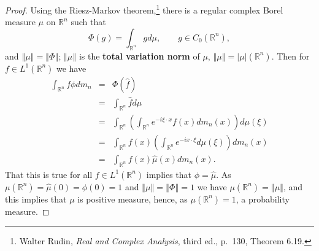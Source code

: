\documentclass{article}
\newcommand{\norm}[1]{\left\Vert #1 \right\Vert}
\theoremstyle{definition}
\theoremstyle{definition}
\begin{document}
\begin{proof}
Using the Riesz-Markov theorem,\footnote{Walter Rudin, {\em Real and Complex Analysis}, third ed., p.~130, Theorem 6.19.}
there is a regular complex Borel measure $\mu$ on $\mathbb{R}^n$ such that
\[
\Phi(g) = \int_{\mathbb{R}^n} g d\mu, \qquad g \in C_0(\mathbb{R}^n),
\]
and $\norm{\mu}=\norm{\Phi}$; $\norm{\mu}$ is the \textbf{total variation norm} of $\mu$, $\norm{\mu}=|\mu|(\mathbb{R}^n)$.
Then for $f \in L^1(\mathbb{R}^n)$ we have
\begin{eqnarray*}
\int_{\mathbb{R}^n} f\phi dm_n&=&\Phi(\hat{f})\\
&=&\int_{\mathbb{R}^n} \hat{f} d\mu \\
&=&\int_{\mathbb{R}^n}\left( \int_{\mathbb{R}^n} e^{-i\xi\cdot x} f(x) dm_n(x) \right) d\mu(\xi)\\
&=&\int_{\mathbb{R}^n} f(x) \left( \int_{\mathbb{R}^n} e^{-ix\cdot \xi} d\mu(\xi) \right) dm_n(x)\\
&=&\int_{\mathbb{R}^n} f(x) \hat{\mu}(x) dm_n(x).
\end{eqnarray*}
That this is true for all $f \in L^1(\mathbb{R}^n)$ implies that $\phi=\hat{\mu}$.
As $\mu(\mathbb{R}^n)=\hat{\mu}(0)=\phi(0)=1$ and $\norm{\mu}=\norm{\Phi}=1$ we have $\mu(\mathbb{R}^n) = \norm{\mu}$, and this implies that
$\mu$ is positive measure, hence, as $\mu(\mathbb{R}^n)=1$, a probability measure.

\end{proof}
\end{document}
